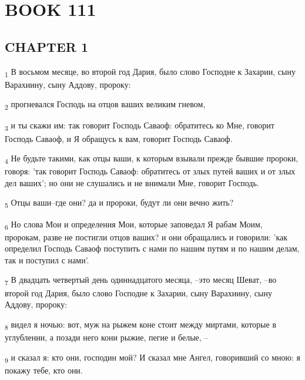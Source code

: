 \section{BOOK 111}
\subsection{CHAPTER 1}
\begin{tcolorbox}
\textsubscript{1} В восьмом месяце, во второй год Дария, было слово Господне к Захарии, сыну Варахиину, сыну Аддову, пророку:
\end{tcolorbox}
\begin{tcolorbox}
\textsubscript{2} прогневался Господь на отцов ваших великим гневом,
\end{tcolorbox}
\begin{tcolorbox}
\textsubscript{3} и ты скажи им: так говорит Господь Саваоф: обратитесь ко Мне, говорит Господь Саваоф, и Я обращусь к вам, говорит Господь Саваоф.
\end{tcolorbox}
\begin{tcolorbox}
\textsubscript{4} Не будьте такими, как отцы ваши, к которым взывали прежде бывшие пророки, говоря: 'так говорит Господь Саваоф: обратитесь от злых путей ваших и от злых дел ваших'; но они не слушались и не внимали Мне, говорит Господь.
\end{tcolorbox}
\begin{tcolorbox}
\textsubscript{5} Отцы ваши--где они? да и пророки, будут ли они вечно жить?
\end{tcolorbox}
\begin{tcolorbox}
\textsubscript{6} Но слова Мои и определения Мои, которые заповедал Я рабам Моим, пророкам, разве не постигли отцов ваших? и они обращались и говорили: 'как определил Господь Саваоф поступить с нами по нашим путям и по нашим делам, так и поступил с нами'.
\end{tcolorbox}
\begin{tcolorbox}
\textsubscript{7} В двадцать четвертый день одиннадцатого месяца, --это месяц Шеват, --во второй год Дария, было слово Господне к Захарии, сыну Варахиину, сыну Аддову, пророку:
\end{tcolorbox}
\begin{tcolorbox}
\textsubscript{8} видел я ночью: вот, муж на рыжем коне стоит между миртами, которые в углублении, а позади него кони рыжие, пегие и белые, --
\end{tcolorbox}
\begin{tcolorbox}
\textsubscript{9} и сказал я: кто они, господин мой? И сказал мне Ангел, говоривший со мною: я покажу тебе, кто они.
\end{tcolorbox}
